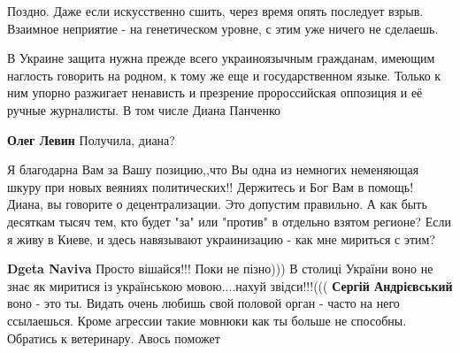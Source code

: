 \begin{itemize}

Поздно. Даже если искусственно сшить, через время опять последует взрыв.
Взаимное неприятие - на генетическом уровне, с этим уже ничего не сделаешь.


В Украине защита нужна прежде всего украиноязычным гражданам, имеющим наглость
говорить на родном, к тому же еще и государственном языке. Только к ним упорно
разжигает ненависть и презрение пророссийская оппозиция и её ручные журналисты.
В том числе Диана Панченко
\begin{itemize}
\textbf{Олег Левин} Получила, диана?
\end{itemize}

Я благодарна Вам за Вашу позицию,,что Вы одна из немногих неменяющая шкуру при
новых веяниях политических!! Держитесь и Бог Вам в помощь!
Диана, вы говорите о децентрализации. Это допустим правильно. А как быть
десяткам тысяч тем, кто будет "за" или "против" в отдельно взятом регионе? Если
я живу в Киеве, и здесь навязывают украинизацию - как мне мириться с этим?
\begin{itemize}
\textbf{Dgeta Naviva} Просто вішайся!!! Поки не пізно))) В столиці України воно не знає як миритися із українською мовою....нахуй звідси!!!(((
\textbf{Сергій Андрієвський} воно - это ты. Видать очень любишь свой половой орган - часто на него ссылаешься. Кроме агрессии такие мовнюки как ты больше не способны. Обратись к ветеринару. Авось поможет
\end{itemize}


\end{itemize}
